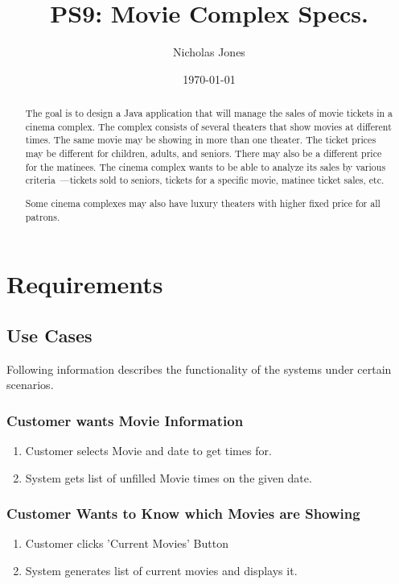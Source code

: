 \documentclass[12pt,titlepage,letterpaper]{article}
\title{PS9: Movie Complex Specs.}
\author{Nicholas Jones}
\date{\today}
\begin{document}
\maketitle
 
\tableofcontents
\newpage

\begin{abstract}

The goal is to design a Java application that will manage the sales of movie tickets in a cinema complex. The complex consists of several theaters that show movies at different times. The same movie may be showing in more than one theater. The ticket prices may be different for children, adults, and seniors. There may also be a different price for the matinees. The cinema complex wants to be able to analyze its sales by various criteria~---tickets sold to seniors, tickets for a specific movie, matinee ticket sales, etc.

Some cinema complexes may also have luxury theaters with higher fixed price for all patrons.

\end{abstract}

\section{Requirements}
\subsection{Use Cases}
Following information describes the functionality of the systems under certain scenarios.

\subsubsection{Customer wants Movie Information}
\begin{enumerate}
 	\item Customer selects Movie and date to get times for.
 	\item System gets list of unfilled Movie times on the given date.
\end{enumerate}

\subsubsection{Customer Wants to Know which Movies are Showing}
\begin{enumerate}
\item Customer clicks 'Current Movies' Button
\item System generates list of current movies and displays it.
\end{enumerate}
\end{document}
